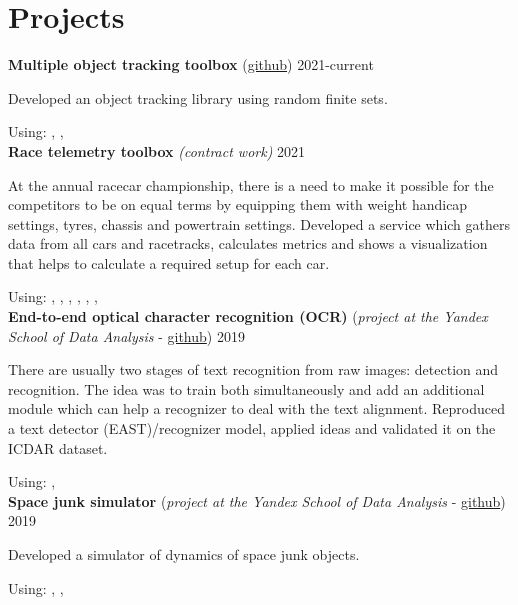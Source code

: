 \section*{\sectionformat Projects}
\textbf{Multiple object tracking toolbox} (\href{https://github.com/neer201/Multi-Object-Tracking-for-Automotive-Systems-in-python}{github}) \hfill 2021-current
\par
Developed an object tracking library using random finite sets.

Using: , , 
\\
% 
\textbf{Race telemetry toolbox} \textit{(contract work)} \hfill 2021
\par
At the annual racecar championship, there is a need to make it possible for the competitors to be on equal terms by equipping them with weight handicap settings, tyres, chassis and powertrain settings.
Developed a service which gathers data from all cars and racetracks, calculates metrics and shows a visualization that helps to calculate a required setup for each car.

Using: , , , , , , 
\\
\textbf{End-to-end optical character recognition (OCR)} (\textit{project at the Yandex School of Data Analysis} - \href{https://github.com/neer201/end2end_OCR}{github})  \hfill 2019
\par
There are usually two stages of text recognition from raw images: detection and recognition. The idea was to train both simultaneously and add an additional module which can help a recognizer to deal with the text alignment. Reproduced a text detector (EAST)/recognizer model, applied ideas and validated it on the ICDAR dataset.

Using: , 
% 
\\
\textbf{Space junk simulator} (\textit{project at the Yandex School of Data Analysis} - \href{https://github.com/neer201/space_junk_simulator}{github})   \hfill 2019
\par
Developed a simulator of dynamics of space junk objects.

Using: , , 
